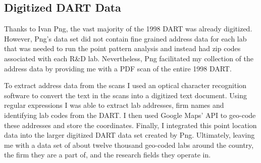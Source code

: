 \documentclass[12pt,letterpaper]{article}
\begin{document}
\subsection{Digitized DART Data}
Thanks to Ivan Png, the vast majority of the 1998 DART was already digitized. However, Png's data set did not contain fine grained address data for each lab that was needed to run the point pattern analysis and instead had zip codes associated with each R\&D lab. Nevertheless, Png facilitated my collection of the address data by providing me with a PDF scan of the entire 1998 DART. 
\par 
To extract address data from the scans I used an optical character recognition software to convert the text in the scans into a digitized text document. Using regular expressions I was able to extract lab addresses, firm names and identifying lab codes from the DART. I then used Google Maps' API to geo-code these addresses and store the coordinates. Finally, I integrated this point location data into the larger digitized DART data set created by Png. Ultimately, leaving me with a data set of about twelve thousand geo-coded labs around the country, the firm they are a part of, and the research fields they operate in. 
\end{document}
